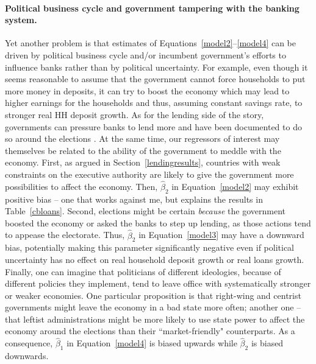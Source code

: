 \documentclass[12pt,a4paper]{article}
\begin{document}
\paragraph{Political business cycle and government tampering with the banking system.} Yet another problem is that estimates of Equations~\eqref{model2}--\eqref{model4} can be driven by political business cycle and/or incumbent government's efforts to influence banks rather than by political uncertainty. For example, even though it seems reasonable to assume that the government cannot force households to put more money in deposits, it can try to boost the economy which may lead to higher earnings for the households and thus, assuming constant savings rate, to stronger real HH deposit growth. As for the lending side of the story, governments can pressure banks to lend more and have been documented to do so around the elections \citep{sapienza2004effects, dincc2005politicians}. At the same time, our regressors of interest may themselves be related to the ability of the government to meddle with the economy. First, as argued in Section~\ref{lendingresults}, countries with weak constraints on the executive authority are likely to give the government more possibilities to affect the economy. Then, $\hat{\beta}_2$ in Equation~\eqref{model2} may exhibit positive bias -- one that works against me, but explains the results in Table~\ref{cbloans}. Second, elections might be certain \emph{because} the government boosted the economy or asked the banks to step up lending, as those actions tend to appease the electorate. Thus, $\hat{\beta}_2$ in Equation~\eqref{model3} may have a downward bias, potentially making this parameter significantly negative even if political uncertainty has no effect on real household deposit growth or real loans growth. Finally, one can imagine that politicians of different ideologies, because of different policies they implement, tend to leave office with systematically stronger or weaker economies. One particular proposition is that right-wing and centrist governments might leave the economy in a bad state more often; another one -- that leftist administrations might be more likely to use state power to affect the economy around the elections than their ``market-friendly" counterparts. As a consequence, $\hat{\beta}_1$ in Equation~\eqref{model4} is biased upwards while $\hat{\beta}_2$ is biased downwards.
\end{document}
